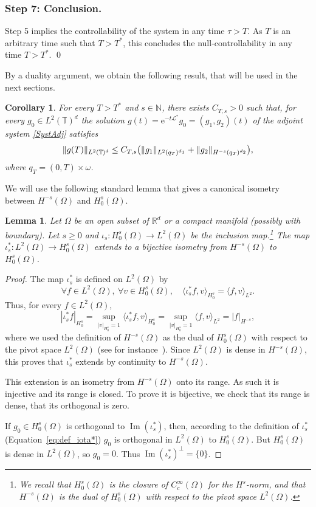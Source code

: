 \documentclass[10pt]{amsart}
\let\mathcal\mathscr
\theoremstyle{plain}
\newtheorem{corollary}[theorem]{Corollary}
\newtheorem{lemma}[theorem]{Lemma}
\theoremstyle{definition}
\theoremstyle{remark}
\DeclareMathOperator{\Ima}{Im}
\newcommand{\set}{\mathbb}
\newcommand{\R}{} %
\renewcommand{\R}{\set{R}}
\newcommand{\T}{\set{T}}
\newcommand{\eu}{\mathrm e}
\let\originalleft\left
\let\originalright\right
\renewcommand{\left}{\mathopen{}\mathclose\bgroup\originalleft}
\renewcommand{\right}{\aftergroup\egroup\originalright}
\begin{document}
\subsubsection*{Step 7: Conclusion.} Step 5 implies the controllability of the system in any time \hbox{$\tau>T$}. As $T$ is an arbitrary time such that $T>T^\ast$, this concludes the null-controllability in any time $T>T^\ast$. \hfill\qed
\medskip

By a duality argument, we obtain the following result, that will be used in the next sections.

\begin{corollary}
\label{CorHUM}
For every $T>T^*$ and $s\in\mathbb{N}$, there exists $C_{T,s}>0$ such that,
for every $g_0 \in L^2(\T)^d$ the solution $g(t)=\eu^{-t\mathcal{L}^*} g_0=(g_1,g_2)(t)$ of the adjoint system \eqref{SystAdj} satisfies
\[
\|g(T)\|_{L^2(\T)^d} \leq C_{T,s} \left(\|g_1\|_{L^2(q_T)^{d_1}} + \|g_2\|_{H^{-s}(q_T)^{d_2}} \right),
\]
where $q_T=(0,T)\times\omega$.
\end{corollary}
We will use the following standard lemma that gives a canonical isometry between $H^{-s}(\Omega)$ and $H_0^s(\Omega)$.
\begin{lemma}\label{th:lemma_dual_Hs}
Let $\Omega$ be an open subset of $\R^d$ or a compact manifold (possibly with boundary). Let $s\geq 0$ and $\iota_s\colon H^s_0(\Omega)\to L^2(\Omega)$ be the inclusion map.\footnote{We recall that $H^s_0(\Omega)$ is the closure of $C_c^\infty(\Omega)$ for the $H^s$-norm, and that $H^{-s}(\Omega)$ is the dual of $H^s_0(\Omega)$ with respect to the pivot space $L^2(\Omega)$.} The map $\iota_s^*\colon L^2(\Omega) \to H^s_0(\Omega)$ extends to a bijective isometry from $H^{-s}(\Omega)$ to $H^{s}_0(\Omega)$.
\end{lemma}
\begin{proof}
The map $\iota_s^*$ is defined on $L^2(\Omega)$ by
\begin{equation}\label{eq:def_iota*}
\forall f\in L^2(\Omega),\ \forall v\in H^s_0(\Omega),\quad \langle \iota_s^*f,v\rangle_{H^s_0} = \langle f,v\rangle_{L^2}.\end{equation}
Thus, for every $f\in L^2(\Omega)$,
\[
|\iota_s^*f|_{H^s_0} = \sup_{|v|_{H^s_0} = 1} \langle \iota_s^*f,v\rangle_{H^s_0} = \sup_{|v|_{H^s_0}=1} \langle f,v\rangle_{L^2} = |f|_{H^{-s}},
\]
where we used the definition of $H^{-s}(\Omega)$ as the dual of $H^s_0(\Omega)$ with respect to
the pivot space $L^2(\Omega)$ (see for instance~\cite[\S2.9]{tucsnak_2009}). Since
$L^2(\Omega)$ is dense in $H^{-s}(\Omega)$, this proves that $\iota_s^*$ extends by continuity
to $H^{-s}(\Omega)$.

This extension is an isometry from $H^{-s}(\Omega)$ onto its range. As such it is injective and its range is closed. To prove it is bijective, we check that its range is dense, \ie that its orthogonal is zero.

If $g_0\in H^s_0(\Omega)$ is orthogonal to $\Ima(\iota_s^*)$, then, according to the definition
of $\iota_s^*$ (Equation~\eqref{eq:def_iota*}) $g_0$ is orthogonal in $L^2(\Omega)$ to
$H^s_0(\Omega)$. But $H^s_0(\Omega)$ is dense in $L^2(\Omega)$, so $g_0 = 0$. Thus
$\Ima(\iota_s^*)^\perp = \{0\}$.
\end{proof}
\end{document}
